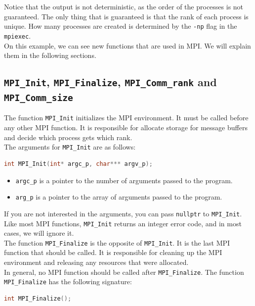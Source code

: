 Notice that the output is not deterministic, as the order of the processes is not
guaranteed. The only thing that is guaranteed is that the rank of each process is unique.
How many processes are created is determined by the \texttt{-np} flag in the \texttt{mpiexec}.\\

On this example, we can see new functions that are used in MPI. We will explain them in the
following sections.

\subsection{ \texttt{MPI\_Init}, \texttt{MPI\_Finalize}, \texttt{MPI\_Comm\_rank} and \texttt{MPI\_Comm\_size}}

The function \texttt{MPI\_Init} initializes the MPI environment. It must be called before
any other MPI function. It is responsible for allocate storage for message buffers and decide
which process gets which rank.\\

The arguments for \texttt{MPI\_Init} are as follows:
\begin{lstlisting}[language=C++]
int MPI_Init(int* argc_p, char*** argv_p);
\end{lstlisting}

\begin{itemize}
    \item \texttt{argc\_p} is a pointer to the number of arguments passed to the program.
    \item \texttt{arg\_p} is a pointer to the array of arguments passed to the program.
\end{itemize}

If you are not interested in the arguments, you can pass \texttt{nullptr} to \texttt{MPI\_Init}.
Like most MPI functions, \texttt{MPI\_Init} returns an integer error code, and in most cases,
we will ignore it.\\

The function \texttt{MPI\_Finalize} is the opposite of \texttt{MPI\_Init}. It is the last MPI
function that should be called. It is responsible for cleaning up the MPI environment and
releasing any resources that were allocated.\\

In general, no MPI function should be called after \texttt{MPI\_Finalize}. The function
\texttt{MPI\_Finalize} has the following signature:

\begin{lstlisting}[language=C++]
int MPI_Finalize();
\end{lstlisting}

